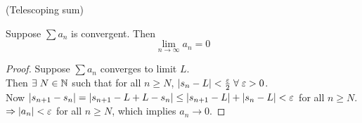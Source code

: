 \documentclass[12pt]{article}
\begin{document}
\begin{rem}
    (Telescoping sum)
\end{rem}

\begin{thm} \label{thm:divergence test}
    Suppose $\sum a_{n}$ is convergent. Then \[
        \lim_{n \to \infty} a_{n} = 0
    \]
\end{thm}
\begin{proof}
    Suppose $\sum a_{n}$ converges to limit $L$. \\
    Then $\exists\; N \in \mathbb{N}$ such that for all $n \geq N$, $\abs{ s_{n} - L } < \frac{\varepsilon}{2} \;\forall\; \varepsilon > 0$.  \\
    Now $\abs{ s_{n+1} - s_{n} } = \abs{ s_{n+1} - L + L - s_{n} } \leq \abs{ s_{n+1} - L } + \abs{ s_{n} - L } < \varepsilon$ for all $n \geq N$. \\
    $\implies \abs{ a_{n} } < \varepsilon$ for all $n \geq N$, which implies $a_{n} \to 0$.
\end{proof}
\end{document}

